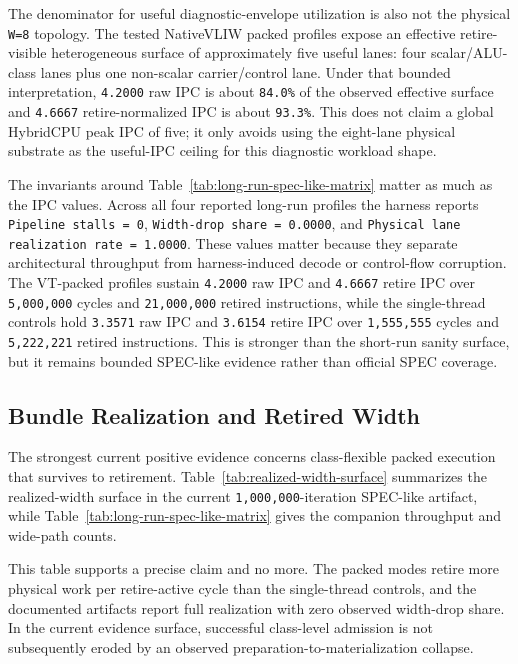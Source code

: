 \documentclass[twocolumn]{article}
\begin{document}
The denominator for useful diagnostic-envelope utilization is also not the physical \texttt{W=8} topology. The tested NativeVLIW packed profiles expose an effective retire-visible heterogeneous surface of approximately five useful lanes: four scalar/ALU-class lanes plus one non-scalar carrier/control lane. Under that bounded interpretation, \texttt{4.2000} raw IPC is about \texttt{84.0\%} of the observed effective surface and \texttt{4.6667} retire-normalized IPC is about \texttt{93.3\%}. This does not claim a global HybridCPU peak IPC of five; it only avoids using the eight-lane physical substrate as the useful-IPC ceiling for this diagnostic workload shape.

The invariants around Table~\ref{tab:long-run-spec-like-matrix} matter as much as the IPC values. Across all four reported long-run profiles the harness reports \texttt{Pipeline stalls = 0}, \texttt{Width-drop share = 0.0000}, and \texttt{Physical lane realization rate = 1.0000}. These values matter because they separate architectural throughput from harness-induced decode or control-flow corruption. The VT-packed profiles sustain \texttt{4.2000} raw IPC and \texttt{4.6667} retire IPC over \texttt{5,000,000} cycles and \texttt{21,000,000} retired instructions, while the single-thread controls hold \texttt{3.3571} raw IPC and \texttt{3.6154} retire IPC over \texttt{1,555,555} cycles and \texttt{5,222,221} retired instructions. This is stronger than the short-run sanity surface, but it remains bounded SPEC-like evidence rather than official SPEC coverage.


\subsection{Bundle Realization and Retired Width}

The strongest current positive evidence concerns class-flexible packed execution that survives to retirement. Table~\ref{tab:realized-width-surface} summarizes the realized-width surface in the current \texttt{1,000,000}-iteration SPEC-like artifact, while Table~\ref{tab:long-run-spec-like-matrix} gives the companion throughput and wide-path counts.



This table supports a precise claim and no more. The packed modes retire more physical work per retire-active cycle than the single-thread controls, and the documented artifacts report full realization with zero observed width-drop share. In the current evidence surface, successful class-level admission is not subsequently eroded by an observed preparation-to-materialization collapse.
\end{document}
